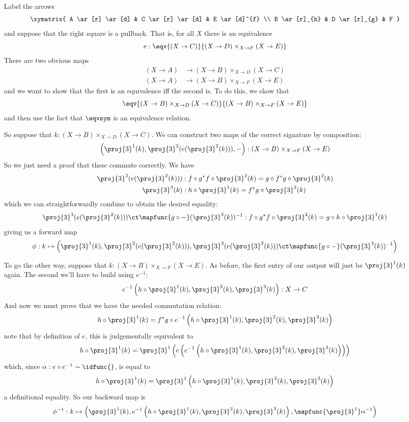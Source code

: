  \soln
Label the arrows
\[\xymatrix{
  A \ar[r] \ar[d] & C \ar[r] \ar[d] & E \ar[d]^{f} \\
  B \ar[r]_{h} & D \ar[r]_{g} & F
}\]
and suppose that the right square is a pullback.  That is, for all $X$ there is
an equivalence
\[
  e : \eqv{(X \to C)}{(X \to D) \times_{X \to F} (X \to E)}
\]
There are two obvious maps
\begin{align*}
  (X \to A) &\to (X \to B) \times_{X \to D} (X \to C) \\
  (X \to A) &\to (X \to B) \times_{X \to F} (X \to E)
\end{align*}
and we want to show that the first is an equivalence iff the second is.  To do
this, we show that 
\[
  \eqv{
    (X \to B) \times_{X \to D} (X \to C)
  }{
    (X \to B) \times_{X \to F} (X \to E)
  }
\]
and then use the fact that $\eqvsym$ is an equivalence relation.


So suppose that $k : (X \to B) \times_{X \to D} (X \to C)$.  We can construct
two maps of the correct signature by composition:
\[
  \left(\proj{3}^{1}(k), \proj{3}^{2}(e(\proj{3}^{2}(k))), -\right)
  :
  (X \to B) \times_{X \to F} (X \to E)
\]
So we just need a proof that these commute correctly.  We have
\begin{align*}
  \proj{3}^{3}(e(\proj{3}^{2}(k))) &: 
    f \circ g^{*}f \circ \proj{3}^{2}(k)
    =
    g \circ f^{*}g \circ \proj{3}^{2}(k)
    \\
  \proj{3}^{3}(k) &:
  h \circ \proj{3}^{1}(k)
  =
  f^{*}g \circ \proj{3}^{2}(k)
\end{align*}
which we can straightforwardly combine to obtain the desired equality:
\[
  \proj{3}^{3}(e(\proj{3}^{2}(k))) \ct \mapfunc{g \circ
  -}(\proj{3}^{3}(k))^{-1}
  :
  f \circ g^{*}f \circ \proj{3}^{2}(k)
  =
  g \circ h \circ \proj{3}^{1}(k)
\]                              
giving us a forward map
\[
\phi : k \mapsto
  \left(\proj{3}^{1}(k), \proj{3}^{2}(e(\proj{3}^{2}(k))), 
  \proj{3}^{3}(e(\proj{3}^{2}(k))) \ct \mapfunc{g \circ
  -}(\proj{3}^{3}(k))^{-1}
  \right)
\]


To go the other way, suppose that $k : (X \to B) \times_{X \to F} (X \to E)$.
As before, the first entry of our output will just be $\proj{3}^{1}(k)$ again.
The second we'll have to build using $e^{-1}$:
\[
  e^{-1}\left(h \circ \proj{3}^{1}(k), \proj{3}^{2}(k), \proj{3}^{3}(k)\right)
  :
  X \to C
\]
And now we must prove that we have the needed commutation relation:
\[
  h \circ \proj{3}^{1}(k) = f^{*}g \circ e^{-1}\left(h \circ \proj{3}^{1}(k), \proj{3}^{2}(k), \proj{3}^{3}(k)\right)
\]
note that by definition of $e$, this is judgementally equivalent to
\[
  h \circ \proj{3}^{1}(k) = \proj{3}^{1}\left(e\left(e^{-1}\left(h \circ
  \proj{3}^{1}(k), \proj{3}^{2}(k), \proj{3}^{3}(k)\right) \right)\right)
\]
which, since $\alpha : e \circ e^{-1} \sim \idfunc{}$, is equal to
\[
  h \circ \proj{3}^{1}(k) = \proj{3}^{1}\left(h \circ
  \proj{3}^{1}(k), \proj{3}^{2}(k), \proj{3}^{3}(k)\right)
\]
a definitional equality.  So our backward map is
\[
  \phi^{-1} : k \mapsto
  \left(\proj{3}^{1}(k),
  e^{-1}\left(h \circ
  \proj{3}^{1}(k), \proj{3}^{2}(k), \proj{3}^{3}(k)\right),
  \mapfunc{\proj{3}^{1}}\alpha^{-1}
  \right)
\]


